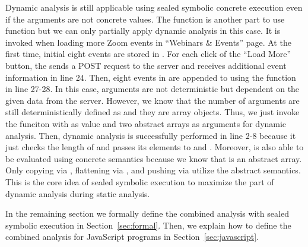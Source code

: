 Dynamic analysis is still applicable using sealed symbolic concrete execution even if the
arguments are not concrete values.  The  function is another
part to use  function but we can only partially apply dynamic
analysis in this case.  It is invoked when loading more Zoom events in
``Webinars \& Events'' page.  At the first time, initial eight events are stored
in .  For each click of the ``Load More'' button, the
 sends a POST request to the server and receives additional
event information  in line 24.  Then, eight events in
 are appended to  using the
 function in line 27-28.  In this case, arguments are not
deterministic but dependent on the given data from the server.  However, we know
that the number of arguments are still deterministically defined as 
and they are array objects.  Thus, we just invoke the funciton 
with \jscode{\_} as  value and two abstract arrays as arguments for
dynamic analysis.  Then, dynamic analysis is successfully performed in line 2-8
because it just checks the length of  and passes its elements
to  and .  Moreover,  is also
able to be evaluated using concrete semantics because we know that 
is an abstract array.  Only copying via , flattening via
, and pushing via  utilize the abstract
semantics.  This is the core idea of sealed symbolic execution to maximize the
part of dynamic analysis during static analysis.

In the remaining section we formally define the combined analysis with sealed
symbolic execution in Section~\ref{sec:formal}.  Then, we explain how to define
the combined analysis for JavaScript programs in Section~\ref{sec:javascript}.
